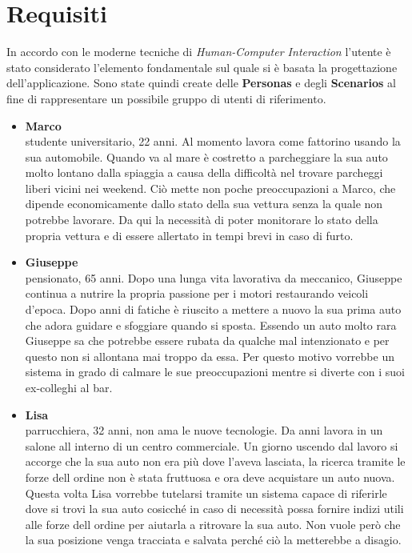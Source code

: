 \documentclass{report}
\begin{document}
\section{Requisiti}
In accordo con le moderne tecniche di \textit{Human-Computer Interaction} l'utente è stato considerato l'elemento fondamentale sul quale si è basata la progettazione dell'applicazione. Sono state quindi create delle \textbf{Personas} e degli \textbf{Scenarios} al fine di rappresentare un possibile gruppo di utenti di riferimento.
\begin{itemize}
    \item \textbf{Marco}\\studente universitario, 22 anni. Al momento lavora come fattorino usando la sua automobile. Quando va al mare è costretto a parcheggiare la sua auto molto lontano dalla spiaggia a causa della difficoltà nel trovare parcheggi liberi vicini nei weekend. Ciò mette non poche preoccupazioni a Marco, che dipende economicamente dallo stato della sua vettura senza la quale non potrebbe lavorare. Da qui la necessità di poter monitorare lo stato della propria vettura e di essere allertato in tempi brevi in caso di furto.

    \item \textbf{Giuseppe}\\pensionato, 65 anni. Dopo una lunga vita lavorativa da meccanico, Giuseppe continua a nutrire la propria passione per i motori restaurando veicoli d'epoca. Dopo anni di fatiche è riuscito a mettere a nuovo la sua prima auto che adora guidare e sfoggiare quando si sposta. Essendo un auto molto rara Giuseppe sa che potrebbe essere rubata da qualche mal intenzionato e per questo non si allontana mai troppo da essa. Per questo motivo vorrebbe un sistema in grado di calmare le sue preoccupazioni mentre si diverte con i suoi ex-colleghi al bar.

    \item \textbf{Lisa}\\parrucchiera, 32 anni, non ama le nuove tecnologie. Da anni lavora in un salone all interno di un centro commerciale. Un giorno uscendo dal lavoro si accorge che la sua auto non era più dove l'aveva lasciata, la ricerca tramite le forze dell ordine non è stata fruttuosa e ora deve acquistare un auto nuova. Questa volta Lisa vorrebbe tutelarsi tramite un sistema capace di riferirle dove si trovi la sua auto cosicché in caso di necessità possa fornire indizi utili alle forze dell ordine per aiutarla a ritrovare la sua auto. Non vuole però che la sua posizione venga tracciata e salvata perché ciò la metterebbe a disagio.
\end{itemize}
\end{document}
